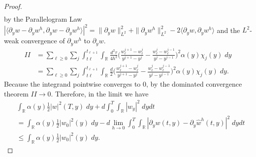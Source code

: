 \documentclass[a4paper,11pt]{article}
\theoremstyle{remark}
\begin{document}
\begin{proof}
\begin{align*}
   \end{align*}
   by the Parallelogram Law $|\langle \partial_y w-\partial_y w^h, \partial_y w-\partial_y w^h\rangle|^2 = \|\partial_y w\|^2_{L^2} + \|\partial_y w^h\|^2_{L^2} - 2\langle \partial_y w,\partial_y w^h\rangle$ and the $L^2$-weak convergence of $\partial_y w^h$ to $\partial_y w$.
   \begin{align*}
    II &=\sum_{\ell\ge0}\sum_j\int_{t\ell}^{t_{\ell+1}}\int_\mathbb{R} \tfrac{d^2\tau}{4h^2}  \Big(\tfrac{w^{j+1}_{\ell} - w^{j}_{\ell}}{y^{j+1}-y^j} - \tfrac{w^{j}_{\ell} - w^{j-1}_{\ell}}{y^{j}-y^{j-1}}\Big)^2\alpha(y) \chi_j(y)\; dy\\
    &=\sum_{\ell\ge0}\sum_j\int_{t\ell}^{t_{\ell+1}}\int_\mathbb{R} \tfrac{d}{2}  \Big(\tfrac{w^{j+1}_{\ell} - w^{j}_{\ell}}{y^{j+1}-y^j} - \tfrac{w^{j}_{\ell} - w^{j-1}_{\ell}}{y^{j}-y^{j-1}}\Big)^2\alpha(y) \chi_j(y)\; dy.
   \end{align*}
   Because the integrand pointwise converges to $0$, by the dominated convergence theorem $II \rightarrow 0$. Therefore, in the limit we have
   \begin{align*} \label{energyID}
 &\int_\mathbb{R} \alpha(y) \frac{1}{2} |w|^2(T,y)\; dy + d \int_0^T\int_\mathbb{R} |w_y|^2 \; dydt\\
 &= \int_\mathbb{R} \alpha(y) \frac{1}{2} |w_0|^2(y)\; dy -  d \lim_{h \rightarrow 0} \int_0^T\int_\mathbb{R} |\partial_y w(t,y)-\partial_y\hat{w}^h(t,y)|^2\;dydt\\
 &\le \int_\mathbb{R} \alpha(y) \frac{1}{2} |w_0|^2(y)\; dy.
\end{align*}
\end{proof}
\end{document}
